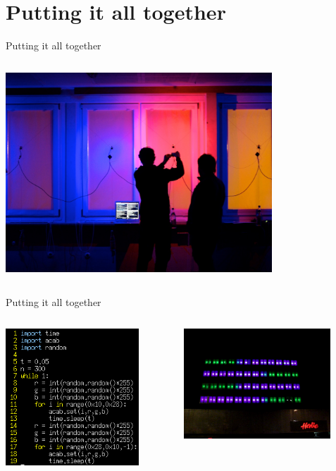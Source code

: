 \documentclass{beamer}
\begin{document}
\section{Putting it all together}

\begin{frame}{Putting it all together}
  \begin{columns}
    \begin{column}{10cm}
      \includegraphics[width=10cm]{bilder/tests.jpg}
    \end{column}
  \end{columns}
\end{frame}

\begin{frame}{Putting it all together}
  \begin{columns}
    \begin{column}{5cm}
      \includegraphics[width=5cm]{bilder/fill.png}
    \end{column}
    \begin{column}{5cm}
      \includegraphics[width=5.5cm]{bilder/fail.png}
    \end{column}
  \end{columns}
\end{frame}
\end{document}
